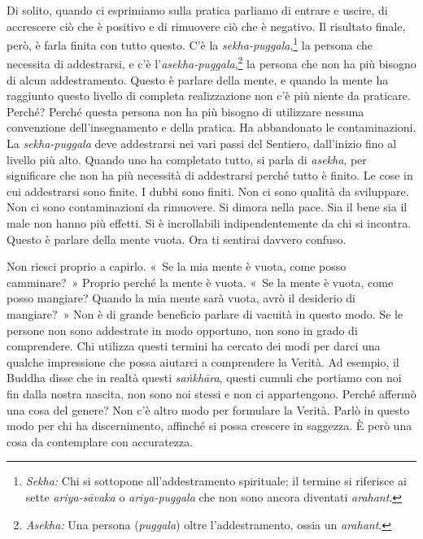 Di solito, quando ci esprimiamo sulla pratica parliamo di entrare e
uscire, di accrescere ciò che è positivo e di rimuovere ciò che è
negativo. Il risultato finale, però, è farla finita con tutto questo.
C'è la \emph{sekha-puggala},\footnote{\emph{Sekha:} Chi si sottopone
  all'addestramento spirituale; il termine si riferisce ai sette
  \emph{ariya-sāvaka} o \emph{ariya-puggala} che non sono ancora diventati
  \emph{arahant}.} la persona che necessita di addestrarsi, e c'è
l'\emph{asekha-puggala},\footnote{\emph{Asekha:} Una persona
  (\emph{puggala}) oltre l'addestramento, ossia un \emph{arahant}.} la
persona che non ha più bisogno di alcun addestramento. Questo è parlare
della mente, e quando la mente ha raggiunto questo livello di completa
realizzazione non c'è più niente da praticare. Perché? Perché questa
persona non ha più bisogno di utilizzare nessuna convenzione
dell'insegnamento e della pratica. Ha abbandonato le contaminazioni. La
\emph{sekha-puggala} deve addestrarsi nei vari passi del Sentiero,
dall'inizio fino al livello più alto. Quando uno ha completato tutto, si
parla di \emph{asekha}, per significare che non ha più necessità di
addestrarsi perché tutto è finito. Le cose in cui addestrarsi sono
finite. I dubbi sono finiti. Non ci sono qualità da sviluppare. Non ci
sono contaminazioni da rimuovere. Si dimora nella pace. Sia il bene sia
il male non hanno più effetti. Si è incrollabili indipendentemente da
chi si incontra. Questo è parlare della mente vuota. Ora ti sentirai
davvero confuso.

Non riesci proprio a capirlo. «~Se la mia mente è vuota, come posso
camminare?~» Proprio perché la mente è vuota. «~Se la mente è vuota,
come posso mangiare? Quando la mia mente sarà vuota, avrò il desiderio
di mangiare?~» Non è di grande beneficio parlare di vacuità in questo
modo. Se le persone non sono addestrate in modo opportuno, non sono in
grado di comprendere. Chi utilizza questi termini ha cercato dei modi
per darci una qualche impressione che possa aiutarci a comprendere la
Verità. Ad esempio, il Buddha disse che in realtà questi
\emph{saṅkhāra}, questi cumuli che portiamo con noi fin dalla nostra
nascita, non sono noi stessi e non ci appartengono. Perché affermò una
cosa del genere? Non c'è altro modo per formulare la Verità. Parlò in
questo modo per chi ha discernimento, affinché si possa crescere in
saggezza. È però una cosa da contemplare con accuratezza.

